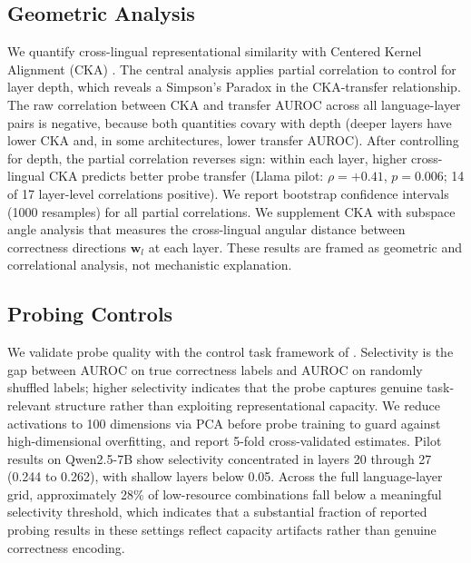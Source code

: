 \subsection{Geometric Analysis}
\label{sec:geometric}

We quantify cross-lingual representational similarity with Centered Kernel Alignment (CKA) \citep{kornblith2019cka}. %
The central analysis applies partial correlation to control for layer depth, which reveals a Simpson's Paradox in the CKA-transfer relationship. The raw correlation between CKA and transfer AUROC across all language-layer pairs is negative, because both quantities covary with depth (deeper layers have lower CKA and, in some architectures, lower transfer AUROC). After controlling for depth, the partial correlation reverses sign: within each layer, higher cross-lingual CKA predicts better probe transfer (Llama pilot: $\rho = +0.41$, $p = 0.006$; 14 of 17 layer-level correlations positive). We report bootstrap confidence intervals (1000 resamples) for all partial correlations. We supplement CKA with subspace angle analysis that measures the cross-lingual angular distance between correctness directions $\mathbf{w}_l$ at each layer. These results are framed as geometric and correlational analysis, not mechanistic explanation.

\subsection{Probing Controls}
\label{sec:controls}

We validate probe quality with the control task framework of \citet{hewitt2019control}. %
Selectivity is the gap between AUROC on true correctness labels and AUROC on randomly shuffled labels; higher selectivity indicates that the probe captures genuine task-relevant structure rather than exploiting representational capacity. We reduce activations to 100 dimensions via PCA before probe training to guard against high-dimensional overfitting, and report 5-fold cross-validated estimates. Pilot results on Qwen2.5-7B show selectivity concentrated in layers 20 through 27 (0.244 to 0.262), with shallow layers below 0.05. Across the full language-layer grid, approximately 28\% of low-resource combinations fall below a meaningful selectivity threshold, which indicates that a substantial fraction of reported probing results in these settings reflect capacity artifacts rather than genuine correctness encoding.
